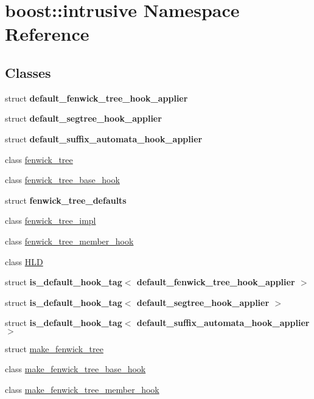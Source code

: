 \hypertarget{namespaceboost_1_1intrusive}{}\section{boost\+:\+:intrusive Namespace Reference}
\label{namespaceboost_1_1intrusive}
\subsection*{Classes}
\begin{DoxyCompactItemize}
\item 
struct {\bfseries default\+\_\+fenwick\+\_\+tree\+\_\+hook\+\_\+applier}
\item 
struct {\bfseries default\+\_\+segtree\+\_\+hook\+\_\+applier}
\item 
struct {\bfseries default\+\_\+suffix\+\_\+automata\+\_\+hook\+\_\+applier}
\item 
class \hyperlink{classboost_1_1intrusive_1_1fenwick__tree}{fenwick\+\_\+tree}
\item 
class \hyperlink{classboost_1_1intrusive_1_1fenwick__tree__base__hook}{fenwick\+\_\+tree\+\_\+base\+\_\+hook}
\item 
struct {\bfseries fenwick\+\_\+tree\+\_\+defaults}
\item 
class \hyperlink{classboost_1_1intrusive_1_1fenwick__tree__impl}{fenwick\+\_\+tree\+\_\+impl}
\item 
class \hyperlink{classboost_1_1intrusive_1_1fenwick__tree__member__hook}{fenwick\+\_\+tree\+\_\+member\+\_\+hook}
\item 
class \hyperlink{classboost_1_1intrusive_1_1HLD}{H\+LD}
\item 
struct {\bfseries is\+\_\+default\+\_\+hook\+\_\+tag$<$ default\+\_\+fenwick\+\_\+tree\+\_\+hook\+\_\+applier $>$}
\item 
struct {\bfseries is\+\_\+default\+\_\+hook\+\_\+tag$<$ default\+\_\+segtree\+\_\+hook\+\_\+applier $>$}
\item 
struct {\bfseries is\+\_\+default\+\_\+hook\+\_\+tag$<$ default\+\_\+suffix\+\_\+automata\+\_\+hook\+\_\+applier $>$}
\item 
struct \hyperlink{structboost_1_1intrusive_1_1make__fenwick__tree}{make\+\_\+fenwick\+\_\+tree}
\item 
class \hyperlink{classboost_1_1intrusive_1_1make__fenwick__tree__base__hook}{make\+\_\+fenwick\+\_\+tree\+\_\+base\+\_\+hook}
\item 
class \hyperlink{classboost_1_1intrusive_1_1make__fenwick__tree__member__hook}{make\+\_\+fenwick\+\_\+tree\+\_\+member\+\_\+hook}

\end{DoxyCompactItemize}
